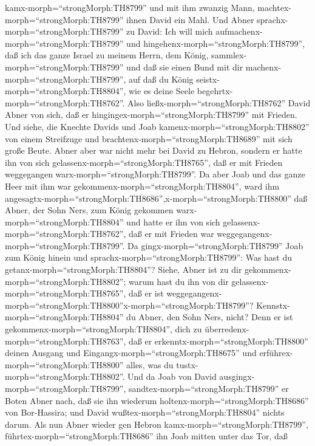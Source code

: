 kamx-morph=``strongMorph:TH8799'' und mit ihm zwanzig Mann,
machtex-morph=``strongMorph:TH8799'' ihnen David ein Mahl. 
Und Abner sprachx-morph=``strongMorph:TH8799'' zu David: Ich will mich
aufmachenx-morph=``strongMorph:TH8799'' und
hingehenx-morph=``strongMorph:TH8799'', daß ich das ganze Israel zu
meinem Herrn, dem König, sammlex-morph=``strongMorph:TH8799'' und daß
sie einen Bund mit dir machenx-morph=``strongMorph:TH8799'', auf daß du
König seistx-morph=``strongMorph:TH8804'', wie es deine Seele
begehrtx-morph=``strongMorph:TH8762''. Also
ließx-morph=``strongMorph:TH8762'' David Abner von sich, daß er
hingingex-morph=``strongMorph:TH8799'' mit Frieden.  Und
siehe, die Knechte Davids und Joab kamenx-morph=``strongMorph:TH8802''
von einem Streifzuge und brachtenx-morph=``strongMorph:TH8689'' mit sich
große Beute. Abner aber war nicht mehr bei David zu Hebron, sondern er
hatte ihn von sich gelassenx-morph=``strongMorph:TH8765'', daß er mit
Frieden weggegangen warx-morph=``strongMorph:TH8799''.  Da
aber Joab und das ganze Heer mit ihm war
gekommenx-morph=``strongMorph:TH8804'', ward ihm
angesagtx-morph=``strongMorph:TH8686'',x-morph=``strongMorph:TH8800''
daß Abner, der Sohn Ners, zum König gekommen
warx-morph=``strongMorph:TH8804'' und hatte er ihn von sich
gelassenx-morph=``strongMorph:TH8762'', daß er mit Frieden war
weggegangenx-morph=``strongMorph:TH8799''.  Da
gingx-morph=``strongMorph:TH8799'' Joab zum König hinein und
sprachx-morph=``strongMorph:TH8799'': Was hast du
getanx-morph=``strongMorph:TH8804''? Siehe, Abner ist zu dir
gekommenx-morph=``strongMorph:TH8802''; warum hast du ihn von dir
gelassenx-morph=``strongMorph:TH8765'', daß er ist
weggegangenx-morph=``strongMorph:TH8800''x-morph=``strongMorph:TH8799''?
 Kennstx-morph=``strongMorph:TH8804'' du Abner, den Sohn
Ners, nicht? Denn er ist gekommenx-morph=``strongMorph:TH8804'', dich zu
überredenx-morph=``strongMorph:TH8763'', daß er
erkenntx-morph=``strongMorph:TH8800'' deinen Ausgang und
Eingangx-morph=``strongMorph:TH8675'' und
erführex-morph=``strongMorph:TH8800'' alles, was du
tustx-morph=``strongMorph:TH8802''.  Und da Joab von David
ausgingx-morph=``strongMorph:TH8799'',
sandtex-morph=``strongMorph:TH8799'' er Boten Abner nach, daß sie ihn
wiederum holtenx-morph=``strongMorph:TH8686'' von Bor-Hassira; und David
wußtex-morph=``strongMorph:TH8804'' nichts darum.  Als nun
Abner wieder gen Hebron kamx-morph=``strongMorph:TH8799'',
führtex-morph=``strongMorph:TH8686'' ihn Joab mitten unter das Tor, daß

